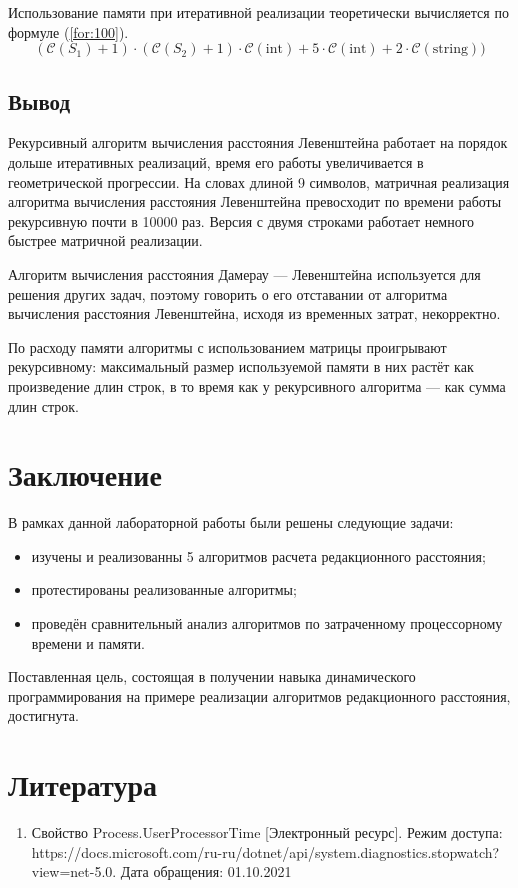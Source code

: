 \documentclass{report}
\begin{document}
Использование памяти при итеративной реализации теоретически вычисляется по формуле (\ref{for:100}).
\begin{equation}
	(\mathcal{C}(S_1) + 1) \cdot (\mathcal{C}(S_2) + 1) \cdot \mathcal{C}\mathrm{(int)} + 5\cdot \mathcal{C}\mathrm{(int)} + 2 \cdot \mathcal{C}\mathrm{(string)})
	\label{for:100}
\end{equation}


\section*{Вывод}

Рекурсивный алгоритм вычисления расстояния Левенштейна работает на порядок дольше итеративных реализаций, время его работы увеличивается в геометрической прогрессии. На словах длиной 9 символов, матричная реализация алгоритма вычисления расстояния Левенштейна превосходит по времени работы рекурсивную почти в 10000 раз. Версия с двумя строками работает немного быстрее матричной реализации. 

Алгоритм вычисления расстояния Дамерау — Левенштейна используется для решения других задач, поэтому говорить о его отставании от алгоритма вычисления расстояния Левенштейна, исходя из временных затрат, некорректно.

По расходу памяти алгоритмы с использованием матрицы проигрывают рекурсивному: максимальный размер используемой памяти в них растёт как произведение длин строк, в то время как у рекурсивного алгоритма — как сумма длин строк.



\chapter*{Заключение}

В рамках данной лабораторной работы были решены следующие задачи:

\begin{itemize}
	\item изучены и реализованны 5 алгоритмов расчета редакционного расстояния;
	\item протестированы реализованные алгоритмы;
	\item проведён сравнительный анализ алгоритмов по затраченному процессорному времени и памяти.
\end{itemize}
Поставленная цель, состоящая в получении навыка динамического программирования на примере реализации алгоритмов редакционного расстояния, достигнута.

\chapter*{Литература}
\begin{enumerate}
	\item Свойство Process.UserProcessorTime [Электронный ресурс]. Режим доступа: https://docs.microsoft.com/ru-ru/dotnet/api/system.diagnostics.stopwatch?view=net-5.0. Дата обращения: 01.10.2021
\end{enumerate}
\end{document}
